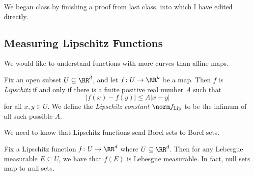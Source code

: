 \documentclass[../notes.tex]{subfiles}
\begin{document}
We began class by finishing a proof from last class, into which I have edited directly.

\subsection{Measuring Lipschitz Functions}
We would like to understand functions with more curves than affine maps.
\begin{definition}[Lipschitz]
	Fix an open subset $U\subseteq\RR^d$, and let $f\colon U\to\RR^k$ be a map. Then $f$ is \textit{Lipschitz} if and only if there is a finite positive real number $A$ such that
	\[\left|f(x)-f(y)\right|\le A\left|x-y\right|\]
	for all $x,y\in U$. We define the \textit{Lipschitz constant} $\norm f_{\mathrm{Lip}}$ to be the infimum of all such possible $A$.
\end{definition}
We need to know that Lipschitz functions send Borel sets to Borel sets.
\begin{lemma}
	Fix a Lipschitz function $f\colon U\to\RR^d$ where $U\subseteq\RR^d$. Then for any Lebesgue measurable $E\subseteq U$, we have that $f(E)$ is Lebesgue measurable. In fact, null sets map to null sets.
\end{lemma}
\end{document}
